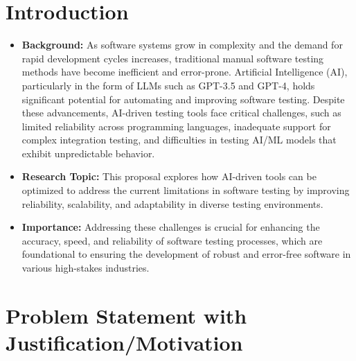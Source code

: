 \documentclass[12pt,a4paper]{article}
\begin{document}
\section{ Introduction}

\begin{itemize}
    \item \textbf{Background:}  As software systems grow in complexity and the demand for rapid development cycles increases, traditional manual software testing methods have become inefficient and error-prone. Artificial Intelligence (AI), particularly in the form of LLMs such as GPT-3.5 and GPT-4, holds significant potential for automating and improving software testing. Despite these advancements, AI-driven testing tools face critical challenges, such as limited reliability across programming languages, inadequate support for complex integration testing, and difficulties in testing AI/ML models that exhibit unpredictable behavior.

    \item \textbf{Research Topic:} This proposal explores how AI-driven tools can be optimized to address the current limitations in software testing by improving reliability, scalability, and adaptability in diverse testing environments.

    \item \textbf{Importance:} Addressing these challenges is crucial for enhancing the accuracy, speed, and reliability of software testing processes, which are foundational to ensuring the development of robust and error-free software in various high-stakes industries.
\end{itemize}
\newpage

\section{Problem Statement with Justification/Motivation}
\end{document}
